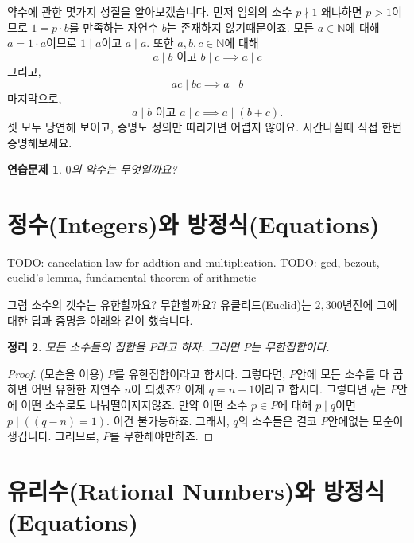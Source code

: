 \documentclass[a4paper, 11pt]{report}
\renewcommand{\<}{\langle}
\renewcommand{\>}{\rangle}
\newtheorem{thm}{정리}[section]
\newtheorem{exercise}[thm]{연습문제}
\begin{document}
약수에 관한 몇가지 성질을 알아보겠습니다. 먼저 임의의 소수 $p \nmid 1$ 왜냐하면 $p > 1$이므로 
$1 = p\cdot b$를 만족하는 자연수 $b$는 존재하지 않기때문이죠. 모든 $a \in \mathbb{N}$에
대해 $a = 1\cdot a$이므로 $1 \mid a$이고 $a \mid a$. 또한 $a, b, c \in \mathbb{N}$에 대해
\begin{equation}
a \mid b \text{ 이고 } b \mid c \implies a \mid c
\end{equation}
그리고,
\begin{equation}
ac \mid bc \implies a \mid b
\end{equation}
마지막으로,
\begin{equation}
a \mid b \text{ 이고 } a \mid c \implies a \mid (b+c).
\end{equation}
셋 모두 당연해 보이고, 증명도 정의만 따라가면 어렵지 않아요. 시간나실때 직접 한번 증명해보세요.

\begin{exercise}
  $0$의 약수는 무엇일까요? 
\end{exercise}

\section{정수(Integers)와 방정식(Equations)}


TODO: cancelation law for addtion and multiplication.
TODO: gcd, bezout, euclid's lemma, fundamental theorem of arithmetic


그럼 소수의 갯수는 유한할까요? 무한할까요? 유클리드(Euclid)는 $2,300$년전에 그에 대한 답과
증명을 아래와 같이 했습니다.

\begin{thm}
  모든 소수들의 집합을 $P$라고 하자. 그러면 $P$는 무한집합이다. 
\end{thm}

\begin{proof}
  (모순을 이용) $P$를 유한집합이라고 합시다. 그렇다면, $P$안에 모든 소수를 다 곱하면 어떤 유한한 
  자연수 $n$이 되겠죠? 이제 $q = n+1$이라고 합시다. 그렇다면 $q$는 $P$안에 어떤 소수로도 나눠떨어지지않죠.
  만약 어떤 소수 $p \in P$에 대해 $p \mid q$이면 $p \mid ((q-n) = 1)$. 이건 불가능하죠.
  그래서, $q$의 소수들은 결코 $P$안에없는 모순이 생깁니다. 그러므로, $P$를 무한해야만하죠.
\end{proof}

\section{유리수(Rational Numbers)와 방정식(Equations)}
\end{document}
